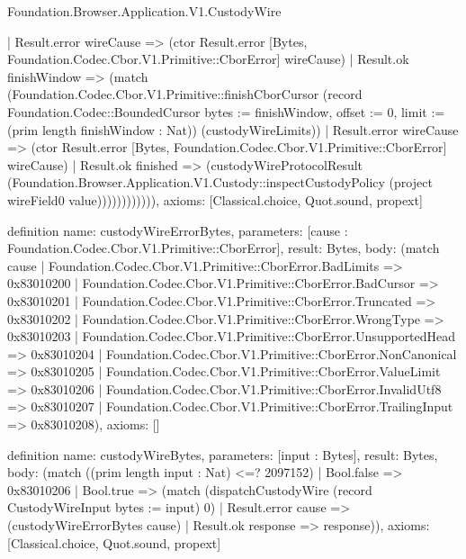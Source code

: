 \begin{lexlean}{Foundation.Browser.Application.V1.CustodyWire}
\begin{semanticmodule}
{                  | Result.error wireCause => (ctor Result.error [Bytes, Foundation.Codec.Cbor.V1.Primitive::CborError] wireCause)
                  | Result.ok finishWindow => (match (Foundation.Codec.Cbor.V1.Primitive::finishCborCursor (record Foundation.Codec::BoundedCursor {bytes := finishWindow, offset := 0, limit := (prim length finishWindow : Nat)}) (custodyWireLimits))
                    | Result.error wireCause => (ctor Result.error [Bytes, Foundation.Codec.Cbor.V1.Primitive::CborError] wireCause)
                    | Result.ok finished => (custodyWireProtocolResult (Foundation.Browser.Application.V1.Custody::inspectCustodyPolicy (project wireField0 value)))))))))))),
  axioms: [Classical.choice, Quot.sound, propext]
}

definition{
  name: custodyWireErrorBytes,
  parameters: [cause : Foundation.Codec.Cbor.V1.Primitive::CborError],
  result: Bytes,
  body: (match cause
    | Foundation.Codec.Cbor.V1.Primitive::CborError.BadLimits => 0x83010200
    | Foundation.Codec.Cbor.V1.Primitive::CborError.BadCursor => 0x83010201
    | Foundation.Codec.Cbor.V1.Primitive::CborError.Truncated => 0x83010202
    | Foundation.Codec.Cbor.V1.Primitive::CborError.WrongType => 0x83010203
    | Foundation.Codec.Cbor.V1.Primitive::CborError.UnsupportedHead => 0x83010204
    | Foundation.Codec.Cbor.V1.Primitive::CborError.NonCanonical => 0x83010205
    | Foundation.Codec.Cbor.V1.Primitive::CborError.ValueLimit => 0x83010206
    | Foundation.Codec.Cbor.V1.Primitive::CborError.InvalidUtf8 => 0x83010207
    | Foundation.Codec.Cbor.V1.Primitive::CborError.TrailingInput => 0x83010208),
  axioms: []
}

definition{
  name: custodyWireBytes,
  parameters: [input : Bytes],
  result: Bytes,
  body: (match ((prim length input : Nat) <=? 2097152)
    | Bool.false => 0x83010206
    | Bool.true => (match (dispatchCustodyWire (record CustodyWireInput {bytes := input}) 0)
      | Result.error cause => (custodyWireErrorBytes cause)
      | Result.ok response => response)),
  axioms: [Classical.choice, Quot.sound, propext]
}
\end{semanticmodule}
\end{lexlean}
